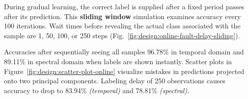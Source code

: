 During gradual learning, the correct label is supplied after a fixed period passes after its prediction. This \textbf{sliding window} simulation examines accuracy every 100 iterations. Wait times before revealing the actual class associated with the sample are 1, 50, 100, or 250 steps (Fig.~\ref{fig:design:online-fault-delay-sliding}). 



Accuracies after sequentially seeing all samples 96.78\% in temporal domain and 89.11\% in spectral domain when labels are shown instantly. Scatter plots in Figure~\ref{fig:design:scatter-plot-online} visualize mistakes in predictions projected onto two principal components. Labeling delay of 250 observations causes accuracy to drop to 83.94\% \emph{(temporal)} and 78.81\% \emph{(spectral)}.
	
	
